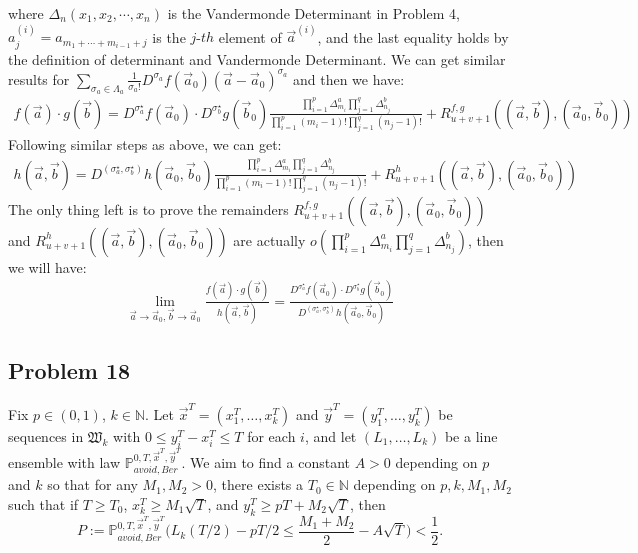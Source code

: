 \documentclass[12pt]{article}
\begin{document}
where $\Delta_{n}(x_{1},x_{2},\cdots,x_{n})$ is the Vandermonde Determinant in Problem 4, $a_{j}^{(i)}=a_{m_{1}+\cdots+m_{i-1}+j}$ is the $j$-$th$ element of $\vec{a}^{(i)}$, and the last equality holds by the definition of determinant and Vandermonde Determinant. We can get similar results for $\sum_{\sigma_{a}\in\Lambda_{a}}\frac{1}{\sigma_{a}!}D^{\sigma_{a}}f(\vec{a}_{0})(\vec{a}-\vec{a}_{0})^{\sigma_{a}}$ and then we have:
\begin{align*}
	f(\vec{a})\cdot g(\vec{b})=D^{\sigma_{a}^{\star}}f(\vec{a}_{0})\cdot D^{\sigma_{b}^{\star}}g(\vec{b}_{0})\frac{\prod_{i=1}^{p}\Delta_{m_{i}}^{a}\prod_{j=1}^{q}\Delta_{n_{j}}^{b}}{\prod_{i=1}^{p}(m_{i}-1)!\prod_{j=1}^{q}(n_{j}-1)!}+R_{u+v+1}^{f,g}((\vec{a},\vec{b}),(\vec{a}_{0},\vec{b}_{0}))
\end{align*}
Following similar steps as above, we can get:
\begin{align*}
	h(\vec{a},\vec{b})=D^{(\sigma_{a}^{\star},\sigma_{b}^{\star})}h(\vec{a}_{0},\vec{b}_{0})\frac{\prod_{i=1}^{p}\Delta_{m_{i}}^{a}\prod_{j=1}^{q}\Delta_{n_{j}}^{b}}{\prod_{i=1}^{p}(m_{i}-1)!\prod_{j=1}^{q}(n_{j}-1)!}+R_{u+v+1}^{h}((\vec{a},\vec{b}),(\vec{a}_{0},\vec{b}_{0}))
\end{align*}
The only thing left is to prove the remainders $R_{u+v+1}^{f,g}((\vec{a},\vec{b}),(\vec{a}_{0},\vec{b}_{0}))$ and $R_{u+v+1}^{h}((\vec{a},\vec{b}),(\vec{a}_{0},\vec{b}_{0}))$ are actually $o(\prod_{i=1}^{p}\Delta_{m_{i}}^{a}\prod_{j=1}^{q}\Delta_{n_{j}}^{b})$, then we will have:
\begin{align*}
	\lim_{\vec{a}\rightarrow \vec{a}_{0},\vec{b}\rightarrow \vec{a}_{0}} \frac{f(\vec{a})\cdot g(\vec{b})}{h(\vec{a},\vec{b})}=\frac{D^{\sigma_{a}^{\star}}f(\vec{a}_{0})\cdot D^{\sigma_{b}^{\star}}g(\vec{b}_{0})}{D^{(\sigma_{a}^{\star},\sigma_{b}^{\star})}h(\vec{a}_{0},\vec{b}_{0})}
\end{align*}



\subsection*{Problem 18}

	Fix $p\in(0,1)$, $k\in\mathbb{N}$. Let $\vec{x}^T = (x_1^T,\dots,x_k^T)$ and $\vec{y}^T = (y_1^T,\dots,y_k^T)$ be sequences in $\mathfrak{W}_k$ with $0\leq y_i^T - x_i^T \leq T$ for each $i$, and let $(L_1,\dots,L_k)$ be a line ensemble with law $\mathbb{P}^{0,T,\vec{x}^T,\vec{y}^T}_{avoid, Ber}$.  We aim to find a constant $A>0$ depending on $p$ and $k$ so that for any $M_1, M_2 > 0$, there exists a $T_0 \in \mathbb{N}$ depending on $p,k,M_1,M_2$ such that if $T\geq T_0$, $x_k^T \geq M_1\sqrt{T}$, and $y_k^T \geq pT + M_2\sqrt{T}$, then
	\[
	P := \mathbb{P}^{0,T,\vec{x}^T,\vec{y}^T}_{avoid, Ber} \Big( L_k(T/2) - pT/2 \leq \frac{M_1+M_2}{2} - A\sqrt{T} \Big) < \frac{1}{2}.
	\]
	
\end{document}

